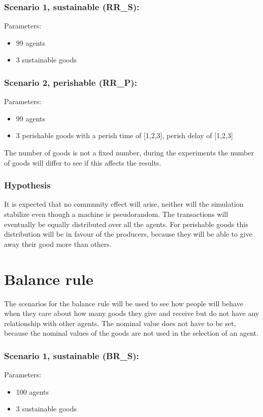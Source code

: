 \documentclass[twoside,openright]{uva-bachelor-thesis}
\begin{document}
\subsubsection{Scenario 1, sustainable (RR\_S):}
Parameters:
\begin{itemize}
\item	99 agents
\item	3 sustainable goods
\end{itemize}
\subsubsection{Scenario 2, perishable (RR\_P):}
Parameters:
\begin{itemize}
\item	99 agents
\item	3 perishable goods with a perish time of [1,2,3], perish delay of [1,2,3]
\end{itemize}
The number of goods is not a fixed number, during the experiments the number of goods will differ to see if this affects the results.

\subsubsection{Hypothesis}
It is expected that no community effect will arise, neither will the simulation stabilize even though a machine is pseudorandom. The transactions will eventually be equally distributed over all the agents. For perishable goods this distribution will be in favour of the producers, because they will be able to give away their good more than others.

\section{Balance rule}
The scenarios for the balance rule will be used to see how people will behave when they care about how many goods they give and receive but do not have any relationship with other agents. The nominal value does not have to be set, because the nominal values of the goods are not used in the selection of an agent.
\subsubsection{Scenario 1, sustainable (BR\_S):}
Parameters:
\begin{itemize}
\item	100 agents
\item	3 sustainable goods
\end{itemize}
\end{document}
